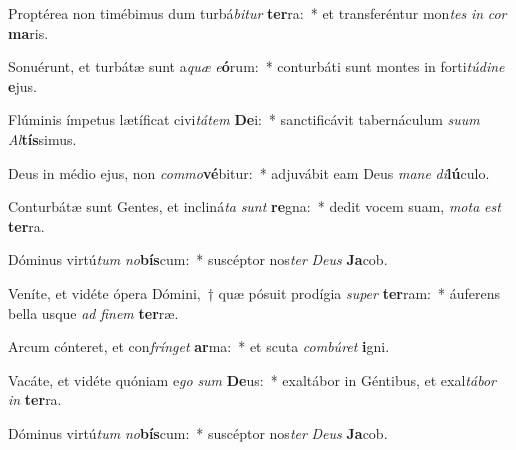 \item Proptérea non timébimus dum turbá\textit{bi}\textit{tur} \textbf{ter}ra:~* et transferéntur mon\textit{tes} \textit{in} \textit{cor} \textbf{ma}ris.
\item Sonuérunt, et turbátæ sunt a\textit{quæ} \textit{e}\textbf{ó}rum:~* conturbáti sunt montes in forti\textit{tú}\textit{di}\textit{ne} \textbf{e}jus.
\item Flúminis ímpetus lætíficat civi\textit{tá}\textit{tem} \textbf{De}i:~* sanctificávit tabernáculum \textit{su}\textit{um} \textit{Al}\textbf{tís}simus.
\item Deus in médio ejus, non \textit{com}\textit{mo}\textbf{vé}bitur:~* adjuvábit eam Deus \textit{ma}\textit{ne} \textit{di}\textbf{lú}culo.
\item Conturbátæ sunt Gentes, et incliná\textit{ta} \textit{sunt} \textbf{re}gna:~* dedit vocem suam, \textit{mo}\textit{ta} \textit{est} \textbf{ter}ra.
\item Dóminus virtú\textit{tum} \textit{no}\textbf{bís}cum:~* suscéptor nos\textit{ter} \textit{De}\textit{us} \textbf{Ja}cob.
\item Veníte, et vidéte ópera Dómini,~† quæ pósuit prodígia \textit{su}\textit{per} \textbf{ter}ram:~* áuferens bella usque \textit{ad} \textit{fi}\textit{nem} \textbf{ter}ræ.
\item Arcum cónteret, et con\textit{frín}\textit{get} \textbf{ar}ma:~* et scuta \textit{com}\textit{bú}\textit{ret} \textbf{i}gni.
\item Vacáte, et vidéte quóniam e\textit{go} \textit{sum} \textbf{De}us:~* exaltábor in Géntibus, et exal\textit{tá}\textit{bor} \textit{in} \textbf{ter}ra.
\item Dóminus virtú\textit{tum} \textit{no}\textbf{bís}cum:~* suscéptor nos\textit{ter} \textit{De}\textit{us} \textbf{Ja}cob.
